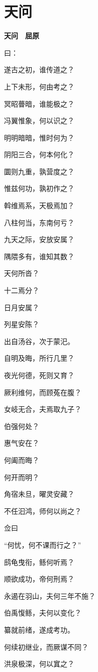 \documentclass[12pt,a4paper]{ctexbook}
\begin{document}
\section{天问}
\textbf{天问　屈原}\par\vspace{0.5em}
曰：\par
遂古之初，谁传道之？\par
上下未形，何由考之？\par
冥昭瞢暗，谁能极之？\par
冯翼惟象，何以识之？\par
明明暗暗，惟时何为？\par
阴阳三合，何本何化？\par
圜则九重，孰营度之？\par
惟兹何功，孰初作之？\par
斡维焉系，天极焉加？\par
八柱何当，东南何亏？\par
九天之际，安放安属？\par
隅隈多有，谁知其数？\par
天何所沓？\par
十二焉分？\par
日月安属？\par
列星安陈？\par
出自汤谷，次于蒙汜。\par
自明及晦，所行几里？\par
夜光何德，死则又育？\par
厥利维何，而顾菟在腹？\par
女岐无合，夫焉取九子？\par
伯强何处？\par
惠气安在？\par
何阖而晦？\par
何开而明？\par
角宿未旦，曜灵安藏？\par
不任汩鸿，师何以尚之？\par
佥曰\par
“何忧，何不课而行之？”\par
鸱龟曳衔，鲧何听焉？\par
顺欲成功，帝何刑焉？\par
永遏在羽山，夫何三年不施？\par
伯禹愎鲧，夫何以变化？\par
纂就前绪，遂成考功。\par
何续初继业，而厥谋不同？\par
洪泉极深，何以窴之？\par
\end{document}
